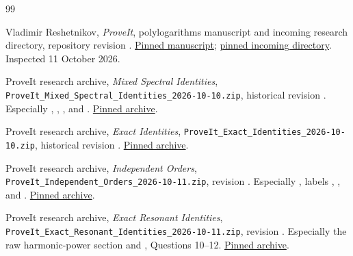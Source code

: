 \begin{thebibliography}{99}

Vladimir Reshetnikov, \emph{ProveIt}, polylogarithms manuscript and
incoming research directory, repository revision
.
\href{https://github.com/VladimirReshetnikov/ProveIt/tree/921b58f1099568bfefa28a556470e4b29e94eb3b/Analysis/Polylogarithms/docs/manuscript}{Pinned manuscript};
\href{https://github.com/VladimirReshetnikov/ProveIt/tree/921b58f1099568bfefa28a556470e4b29e94eb3b/docs/incoming}{pinned incoming directory}.
Inspected 11 October 2026.

ProveIt research archive,
\emph{Mixed Spectral Identities},
\nolinkurl{ProveIt_Mixed_Spectral_Identities_2026-10-10.zip},
historical revision .
Especially ,
,
, and
.
\href{https://github.com/VladimirReshetnikov/ProveIt/blob/5a790187c8e186e41e2b990b4941cb7a1a3c7b6b/docs/incoming/ProveIt_Mixed_Spectral_Identities_2026-10-10.zip}{Pinned archive}.

ProveIt research archive,
\emph{Exact Identities},
\nolinkurl{ProveIt_Exact_Identities_2026-10-10.zip},
historical revision .
\href{https://github.com/VladimirReshetnikov/ProveIt/blob/5a790187c8e186e41e2b990b4941cb7a1a3c7b6b/docs/incoming/ProveIt_Exact_Identities_2026-10-10.zip}{Pinned archive}.

ProveIt research archive,
\emph{Independent Orders},
\nolinkurl{ProveIt_Independent_Orders_2026-10-11.zip},
revision .
Especially , labels
, , and .
\href{https://github.com/VladimirReshetnikov/ProveIt/blob/921b58f1099568bfefa28a556470e4b29e94eb3b/docs/incoming/ProveIt_Independent_Orders_2026-10-11.zip}{Pinned archive}.

ProveIt research archive,
\emph{Exact Resonant Identities},
\nolinkurl{ProveIt_Exact_Resonant_Identities_2026-10-11.zip},
revision .
Especially the raw harmonic-power section and
, Questions 10--12.
\href{https://github.com/VladimirReshetnikov/ProveIt/blob/921b58f1099568bfefa28a556470e4b29e94eb3b/docs/incoming/ProveIt_Exact_Resonant_Identities_2026-10-11.zip}{Pinned archive}.


\end{thebibliography}
